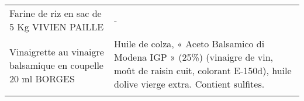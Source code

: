 \begin{longtable}{p{5cm}p{10cm}}
                                                               Farine de riz en sac de 5 Kg VIVIEN PAILLE &                                                                                                                                                                                                                                                                                                                                                                                                                                                                                                                                                                                                                                                                                                                                                                                                                                                                                                                                                                                                                                        - \\
                                              Vinaigrette au vinaigre balsamique en coupelle 20 ml BORGES &                                                                                                                                                                                                                                                                                                                                                                                                                                                                                                                                                                                                                                                                                                                                                                                                                                                                         Huile de colza, « Aceto Balsamico di Modena IGP » (25\%) (vinaigre de vin, moût de raisin cuit, colorant E-150d), huile dolive vierge extra.  Contient sulfites. \\

\end{longtable}
